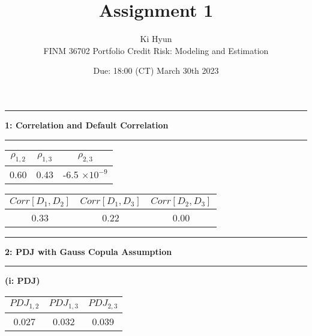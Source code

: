 \documentclass[11pt]{article}
\newcommand\question[2]{\vspace{.25in}\hrule\textbf{#1: #2}\vspace{.5em}\hrule\vspace{.10in}}
\renewcommand\part[1]{\vspace{.10in}\textbf{(#1)}}
\begin{document}
\raggedright


\newcommand\NAME{Ki Hyun}  %
\newcommand\ClassNumber{FINM 36702}
\newcommand\ClassName{Portfolio Credit Risk: Modeling and Estimation}    
\newcommand\ANUM{1}              %
\newcommand\duedate{18:00 (CT) March 30th 2023}	%

\title{Assignment \ANUM}
\author{\NAME \\ 
\ClassNumber \text{:} \ClassName}
\date{Due: \duedate}

\maketitle


\question{1}{Correlation and Default Correlation}

\begin{center}
\begin{tabular}{||c | c | c||} 
 \hline
 $\rho_{1,2}$ & $\rho_{1,3}$ & $\rho_{2,3}$ \\
 \hline
 0.60 & 0.43 & -6.5 $\times 10^{-9}$ \\ 
 \hline
\end{tabular}
\end{center}

\begin{center}
\begin{tabular}{||c | c | c||} 
 \hline
 $Corr[D_1, D_2]$ & $Corr[D_1, D_3]$ & $Corr[D_2, D_3]$ \\
 \hline
 0.33 & 0.22 & 0.00 \\ 
 \hline
\end{tabular}
\end{center}

\question{2}{PDJ with Gauss Copula Assumption}

\part{i: PDJ}

\begin{center}
\begin{tabular}{||c | c | c||} 
 \hline
 $PDJ_{1,2}$ & $PDJ_{1,3}$ & $PDJ_{2,3}$ \\
 \hline
 0.027 & 0.032 & 0.039 \\ 
 \hline
\end{tabular}
\end{center}
\end{document}
